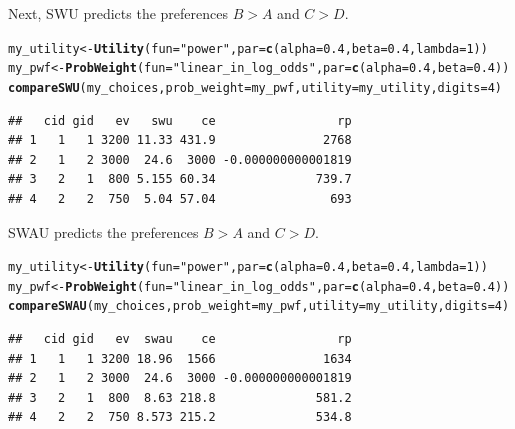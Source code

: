\documentclass{article}\usepackage[]{graphicx}\usepackage[]{color}
\makeatletter
\newcommand{\hlnum}[1]{\textcolor[rgb]{0.686,0.059,0.569}{#1}}%
\newcommand{\hlstr}[1]{\textcolor[rgb]{0.192,0.494,0.8}{#1}}%
\newcommand{\hlstd}[1]{\textcolor[rgb]{0.345,0.345,0.345}{#1}}%
\newcommand{\hlkwb}[1]{\textcolor[rgb]{0.69,0.353,0.396}{#1}}%
\newcommand{\hlkwc}[1]{\textcolor[rgb]{0.333,0.667,0.333}{#1}}%
\newcommand{\hlkwd}[1]{\textcolor[rgb]{0.737,0.353,0.396}{\textbf{#1}}}%
\newenvironment{kframe}{%
 \def\at@end@of@kframe{}%
 \ifinner\ifhmode%
  \def\at@end@of@kframe{\end{minipage}}%
  \begin{minipage}{\columnwidth}%
 \fi\fi%
 \def\FrameCommand##1{\hskip\@totalleftmargin \hskip-\fboxsep
 \colorbox{shadecolor}{##1}\hskip-\fboxsep
     \hskip-\linewidth \hskip-\@totalleftmargin \hskip\columnwidth}%
 \MakeFramed {\advance\hsize-\width
   \@totalleftmargin\z@ \linewidth\hsize
   \@setminipage}}%
 {\par\unskip\endMakeFramed%
 \at@end@of@kframe}
\newenvironment{knitrout}{}{} %
\makeatother
\begin{document}
Next, SWU predicts the preferences $B > A$ and $C > D$.

\begin{knitrout}
\color{fgcolor}\begin{kframe}
\begin{alltt}
\hlstd{my_utility} \hlkwb{<-} \hlkwd{Utility}\hlstd{(}\hlkwc{fun}\hlstd{=}\hlstr{"power"}\hlstd{,} \hlkwc{par}\hlstd{=}\hlkwd{c}\hlstd{(}\hlkwc{alpha}\hlstd{=}\hlnum{0.4}\hlstd{,} \hlkwc{beta}\hlstd{=}\hlnum{0.4}\hlstd{,} \hlkwc{lambda}\hlstd{=}\hlnum{1}\hlstd{))}
\hlstd{my_pwf} \hlkwb{<-} \hlkwd{ProbWeight}\hlstd{(}\hlkwc{fun}\hlstd{=}\hlstr{"linear_in_log_odds"}\hlstd{,} \hlkwc{par}\hlstd{=}\hlkwd{c}\hlstd{(}\hlkwc{alpha}\hlstd{=}\hlnum{0.4}\hlstd{,} \hlkwc{beta}\hlstd{=}\hlnum{0.4}\hlstd{))}
\hlkwd{compareSWU}\hlstd{(my_choices,} \hlkwc{prob_weight}\hlstd{=my_pwf,} \hlkwc{utility}\hlstd{=my_utility,} \hlkwc{digits}\hlstd{=}\hlnum{4}\hlstd{)}
\end{alltt}
\begin{verbatim}
##   cid gid   ev   swu    ce                 rp
## 1   1   1 3200 11.33 431.9               2768
## 2   1   2 3000  24.6  3000 -0.000000000001819
## 3   2   1  800 5.155 60.34              739.7
## 4   2   2  750  5.04 57.04                693
\end{verbatim}
\end{kframe}
\end{knitrout}


SWAU predicts the preferences $B > A$ and $C > D$.

\begin{knitrout}
\color{fgcolor}\begin{kframe}
\begin{alltt}
\hlstd{my_utility} \hlkwb{<-} \hlkwd{Utility}\hlstd{(}\hlkwc{fun}\hlstd{=}\hlstr{"power"}\hlstd{,} \hlkwc{par}\hlstd{=}\hlkwd{c}\hlstd{(}\hlkwc{alpha}\hlstd{=}\hlnum{0.4}\hlstd{,} \hlkwc{beta}\hlstd{=}\hlnum{0.4}\hlstd{,} \hlkwc{lambda}\hlstd{=}\hlnum{1}\hlstd{))}
\hlstd{my_pwf} \hlkwb{<-} \hlkwd{ProbWeight}\hlstd{(}\hlkwc{fun}\hlstd{=}\hlstr{"linear_in_log_odds"}\hlstd{,} \hlkwc{par}\hlstd{=}\hlkwd{c}\hlstd{(}\hlkwc{alpha}\hlstd{=}\hlnum{0.4}\hlstd{,} \hlkwc{beta}\hlstd{=}\hlnum{0.4}\hlstd{))}
\hlkwd{compareSWAU}\hlstd{(my_choices,} \hlkwc{prob_weight}\hlstd{=my_pwf,} \hlkwc{utility}\hlstd{=my_utility,} \hlkwc{digits}\hlstd{=}\hlnum{4}\hlstd{)}
\end{alltt}
\begin{verbatim}
##   cid gid   ev  swau    ce                 rp
## 1   1   1 3200 18.96  1566               1634
## 2   1   2 3000  24.6  3000 -0.000000000001819
## 3   2   1  800  8.63 218.8              581.2
## 4   2   2  750 8.573 215.2              534.8
\end{verbatim}
\end{kframe}
\end{knitrout}
\end{document}
